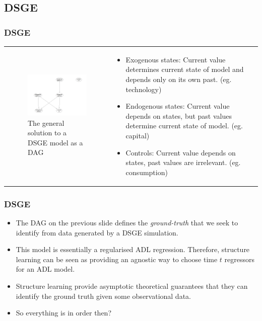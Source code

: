 \documentclass{beamer}
\begin{document}
\subsection{DSGE}
\begin{frame}
    \frametitle{DSGE}
    \begin{tabular}{ p{5cm} p{5cm} }
        \begin{figure}
            \centering
            \includegraphics[width=5cm]{images/dsge_dag.png}
            \caption{The general solution to a DSGE model as a DAG}
            \label{dag3}
          \end{figure}
        &
        \begin{itemize}
            \item Exogenous states: Current value determines current state of model and depends only on its own past. (eg. technology)
            \item Endogenous states: Current value depends on states, but past values determine current state of model. (eg. capital)
            \item Controls: Current value depends on states, past values are irrelevant. (eg. consumption)
        \end{itemize}
    \end{tabular}
\end{frame}

\begin{frame}
    \frametitle{DSGE}
    \begin{itemize}
        \item The DAG on the previous slide defines the \textit{ground-truth} that we seek to identify from data generated by a DSGE simulation.
        \item This model is essentially a regularised ADL regression. Therefore, structure learning can be seen as providing an agnostic way to choose time $t$ regressors for an ADL model. 
        \item Structure learning provide asymptotic theoretical guarantees that they can identify the ground truth given some observational data.
        \item So everything is in order then?
    \end{itemize}
\end{frame}
\end{document}
